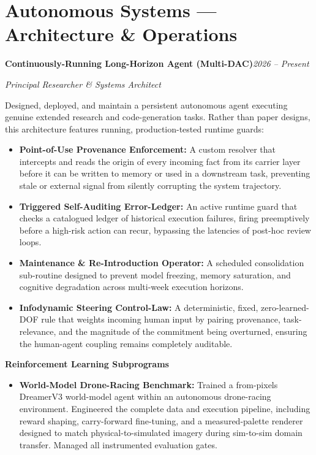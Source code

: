 \documentclass[10pt]{article}
\newcommand{\entry}[2]{\textbf{#1}\hfill\textit{#2}\par\vspace{1pt}}
\begin{document}
\section{Autonomous Systems --- Architecture \& Operations}
\entry{Continuously-Running Long-Horizon Agent (Multi-DAC)}{2026 -- Present}
\textit{Principal Researcher \& Systems Architect}\par
\vspace{3pt}
Designed, deployed, and maintain a persistent autonomous agent executing genuine extended research and code-generation tasks. Rather than paper designs, this architecture features running, production-tested runtime guards:
\begin{itemize}
\item \textbf{Point-of-Use Provenance Enforcement:} A custom resolver that intercepts and reads the origin of every incoming fact from its carrier layer before it can be written to memory or used in a downstream task, preventing stale or external signal from silently corrupting the system trajectory.
\item \textbf{Triggered Self-Auditing Error-Ledger:} An active runtime guard that checks a catalogued ledger of historical execution failures, firing preemptively before a high-risk action can recur, bypassing the latencies of post-hoc review loops.
\item \textbf{Maintenance \& Re-Introduction Operator:} A scheduled consolidation sub-routine designed to prevent model freezing, memory saturation, and cognitive degradation across multi-week execution horizons.
\item \textbf{Infodynamic Steering Control-Law:} A deterministic, fixed, zero-learned-DOF rule that weights incoming human input by pairing provenance, task-relevance, and the magnitude of the commitment being overturned, ensuring the human-agent coupling remains completely auditable.
\end{itemize}
\vspace{4pt}
\textbf{Reinforcement Learning Subprograms}
\begin{itemize}
\item \textbf{World-Model Drone-Racing Benchmark:} Trained a from-pixels DreamerV3 world-model agent within an autonomous drone-racing environment. Engineered the complete data and execution pipeline, including reward shaping, carry-forward fine-tuning, and a measured-palette renderer designed to match physical-to-simulated imagery during sim-to-sim domain transfer. Managed all instrumented evaluation gates.
\end{itemize}
\end{document}
